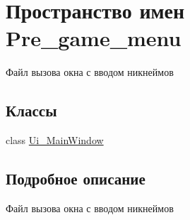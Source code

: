 \hypertarget{namespace_pre__game__menu}{}\section{Пространство имен Pre\+\_\+game\+\_\+menu}
\label{namespace_pre__game__menu}


Файл вызова окна с вводом никнеймов  


\subsection*{Классы}
\begin{DoxyCompactItemize}
\item 
class \mbox{\hyperlink{class_pre__game__menu_1_1_ui___main_window}{Ui\+\_\+\+Main\+Window}}
\end{DoxyCompactItemize}


\subsection{Подробное описание}
Файл вызова окна с вводом никнеймов 